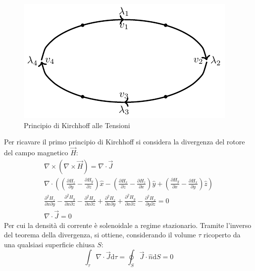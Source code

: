 \documentclass{article}
\newcommand{\df}{\mathrm{d}}
\numberwithin{equation}{subsection}
\begin{document}
\begin{figure}[H]%
    \centering
    \includegraphics{principio-kirchhoff-tensioni.pdf}
    \caption{Principio di Kirchhoff alle Tensioni}
    \label{fig:principio-kirchhoff-tensioni}
\end{figure}

Per ricavare il primo principio di Kirchhoff si considera la divergenza del rotore del campo magnetico $\vec{H}$:
\begin{gather*}
    \nabla\times(\nabla\times\vec{H})=\nabla\cdot\vec{J}\\
    \displaystyle\nabla\cdot\left(\displaystyle\left(\frac{\partial H_z}{\partial y}-\frac{\partial H_y}{\partial z}\right)\hat{x}-\left(\frac{\partial H_x}{\partial z}-\frac{\partial H_z}{\partial x}\right)\hat{y}+\left(\frac{\partial H_y}{\partial x}-\frac{\partial H_x}{\partial y}\right)\hat{z}\right)\\
    \displaystyle\frac{\partial^2H_z}{\partial x\partial y}-\frac{\partial^2H_y}{\partial x\partial z}-\frac{\partial^2H_x}{\partial x\partial z}+\frac{\partial^2H_z}{\partial x\partial y}+\frac{\partial^2 H_y}{\partial x\partial z}-\frac{\partial^2H_x}{\partial y\partial z}=0\\
    \nabla\cdot\vec{J}=0
\end{gather*}
Per cui la densità di corrente è solenoidale a regime stazionario. Tramite l'inverso del teorema della divergenza, si ottiene, considerando il volume $\tau$ ricoperto da una 
qualsiasi superficie chiusa $S$:
\begin{equation*}
    \displaystyle\int_{\tau}\nabla\cdot\vec{J}\df\tau=\oint_{S}\vec{J}\cdot\hat{n}\df S=0
\end{equation*}
\end{document}
